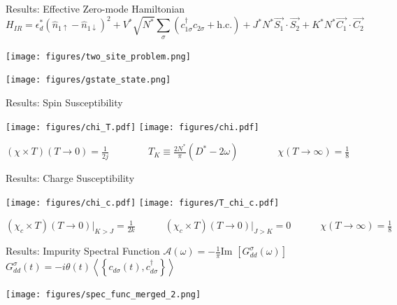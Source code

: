 \documentclass[aspectratio=169]{beamer}
\begin{document}
\begin{frame}{Results: Effective Zero-mode Hamiltonian}
	\vspace*{-30pt}
	\[H_{IR} = \epsilon_d^* \left( \hat n_{1 \uparrow} - \hat n_{1 \downarrow} \right) ^2 + V^*\sqrt{N^*}\sum_{\sigma}\left(c^\dagger_{1\sigma}c_{2\sigma} + \text{h.c.} \right) + J^*N^*\vec{S_1}\cdot\vec{S_2} + K^*N^*\vec{C_1}\cdot\vec{C_2}\]
\hspace*{-15pt}
	\begin{minipage}{0.5\textwidth}
	{\centering
	\texttt{[image: figures/two\_site\_problem.png]}}
\end{minipage}
\hspace*{25pt}
\begin{minipage}{0.45\textwidth}
	{\centering
	\texttt{[image: figures/gstate\_state.png]}}
\end{minipage}
\end{frame}

\begin{frame}{Results: Spin Susceptibility}
\begin{center}
	\hspace*{-20pt}
	\texttt{[image: figures/chi\_T.pdf]}
	\hspace*{25pt}
	\texttt{[image: figures/chi.pdf]}
\end{center}
\hspace*{20pt}\large{\(
\left(\chi\times T\right)\left( T \to 0 \right) = \frac{1}{2j} \quad\quad \quad \quad T_K \equiv \frac{2N^*}{\pi}\left(D^* - 2\omega\right)\quad\quad \quad \quad \chi \left( T \to \infty \right) = \frac{1}{8}\)}

\end{frame}

\begin{frame}{Results: Charge Susceptibility}
\begin{center}
	\hspace*{-20pt}
	\texttt{[image: figures/chi\_c.pdf]}
	\hspace*{25pt}
	\texttt{[image: figures/T\_chi\_c.pdf]}
\end{center}
\large{\(
\left(\chi_c\times T\right)\left(T \to 0\right)\bigg\vert_{K>J} = \frac{1}{2k} \quad\quad\quad \left(\chi_c\times T\right)\left(T \to 0\right)\bigg\vert_{J>K} = 0 \quad\quad\quad \chi \left( T \to \infty \right) = \frac{1}{8}\)}
\end{frame}

\begin{frame}{Results: Impurity Spectral Function}
	\(\mathcal{A(\omega)} = -\frac{1}{\pi}\text{Im }\left[G_{d d}^\sigma\left( \omega \right) \right]\) \hspace*{\fill} \(G_{d d}^\sigma\left(t\right) = -i\theta(t)\left<\left\{ c_{d\sigma}(t), c^\dagger_{d\sigma} \right\}\right>\)
\begin{center}
	\texttt{[image: figures/spec\_func\_merged\_2.png]}
\end{center}
\end{frame}
\end{document}
